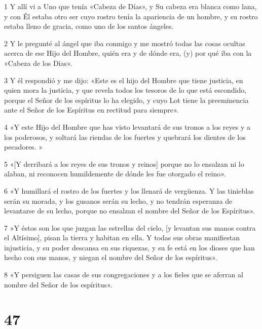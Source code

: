 \par 1 Y allí vi a Uno que tenía «Cabeza de Días», y Su cabeza era blanca como lana, y con Él estaba otro ser cuyo rostro tenía la apariencia de un hombre, y su rostro estaba lleno de gracia, como uno de los santos ángeles.
\par 2 Y le pregunté al ángel que iba conmigo y me mostró todas las cosas ocultas acerca de ese Hijo del Hombre, quién era y de dónde era, (y) por qué iba con la «Cabeza de los Días».
\par 3 Y él respondió y me dijo: «Este es el hijo del Hombre que tiene justicia, en quien mora la justicia, y que revela todos los tesoros de lo que está escondido, porque el Señor de los espíritus lo ha elegido, y cuyo Lot tiene la preeminencia ante el Señor de los Espíritus en rectitud para siempre».
\par 4 «Y este Hijo del Hombre que has visto levantará de sus tronos a los reyes y a los poderosos, y soltará las riendas de los fuertes y quebrará los dientes de los pecadores. »
\par 5 «[Y derribará a los reyes de sus tronos y reinos] porque no lo ensalzan ni lo alaban, ni reconocen humildemente de dónde les fue otorgado el reino».
\par 6 «Y humillará el rostro de los fuertes y los llenará de vergüenza. Y las tinieblas serán su morada, y los gusanos serán su lecho, y no tendrán esperanza de levantarse de su lecho, porque no ensalzan el nombre del Señor de los Espíritus».
\par 7 »Y éstos son los que juzgan las estrellas del cielo, [y levantan sus manos contra el Altísimo], pisan la tierra y habitan en ella. Y todas sus obras manifiestan injusticia, y su poder descansa en sus riquezas, y su fe está en los dioses que han hecho con sus manos, y niegan el nombre del Señor de los espíritus».
\par 8 «Y persiguen las casas de sus congregaciones y a los fieles que se aferran al nombre del Señor de los espíritus».

\chapter{47}

